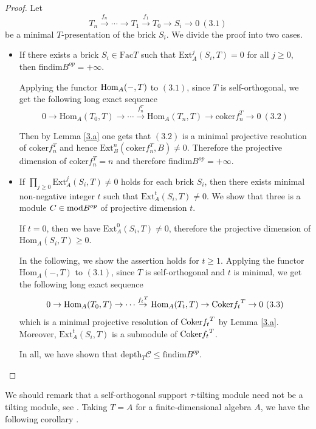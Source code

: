 \documentclass[a4paper]{amsart}
\theoremstyle{definition}
\theoremstyle{remark}
\numberwithin{equation}{section}
\begin{document}
\begin{proof}
 Let $$T_n \stackrel{f_n}{\to} \cdots \to T_1\stackrel{f_1} {\to} T_0 \to S_i \to 0\ (3.1)$$ be a minimal $T$-presentation of the brick $S_i$. We divide the proof into two cases.

\begin{itemize}
  \item [(1)] If there exists a brick $S_i \in \text{Fac}T$ such that $\text{Ext}^j_A (S_i, T) =0$ for all $j\geq 0$, then  findim$ B^{op}=+\infty$.

Applying the functor ${\rm Hom}_A(-, T)$ to $(3.1)$, since $T$ is self-orthogonal, we get the  following long exact sequence
$$0\to \text{Hom}_A(T_0, T)\to \cdots \xrightarrow{f_n^T} \text{Hom}_A(T_n, T)\to \text{coker} f_n ^T \to 0 \ (3.2)$$

\noindent Then by Lemma \ref{3.a} one gets that $(3.2)$ is a minimal projective resolution of $\text{coker} f_n ^T$ and hence $\text{Ext} _B^n (\text{coker}f_n^T, B) \neq 0$. Therefore the projective dimension of coker$f_n^T =n$ and therefore findim$B^{op}= +\infty.$

\item [(2)]  If $\prod _{j\geq 0}\text{Ext} _A^{j} (S_i, T) \neq 0$ holds for each brick $S_i$, then there exists minimal non-negative integer $t$ such that $\text{Ext}^t_A(S_i, T) \neq 0$. We show that three is a module $C\in {\rm mod}B^{op}$ of projective dimension $t$.

If $t=0$, then we have $\text{Ext}^0_A(S_i, T) \neq 0$, therefore the projective dimension of $\text{Hom}_A(S_i, T) \geq 0$.

In the following, we show the assertion holds for $t\geq1$. Applying the functor $\text{Hom}_A(-, T)$ to  $(3.1)$, since $T$ is self-orthogonal and $t$ is minimal, we get the following long exact sequence
$$0\to \text{Hom}_A(T_0, T)\to\cdots \stackrel{{f_t}^T}{\to} \text{Hom}_A(T_t, T)\to \textup{Coker}{f_t}^T \to 0\ (3.3)$$
 which is a minimal projective resolution of $\textup{Coker}{f_t}^T$ by Lemma \ref{3.a}. Moreover, $\text{Ext}^t_A(S_i, T)$ is a submodule of $\textup{Coker}{f_t}^T$. 
 
 In all, we have shown that depth$_T \mathcal{C} \leq \text{findim}B^{op}$.\qedhere
\end{itemize}\noindent
\end{proof}

We should remark that a self-orthogonal support $\tau$-tilting module need not be a tilting module, see \cite[Example 3.6]{Z}. Taking $T=A$ for a finite-dimensional algebra $A$, we have the following corollary \cite[Proposition~1.3]{G}.
\end{document}
